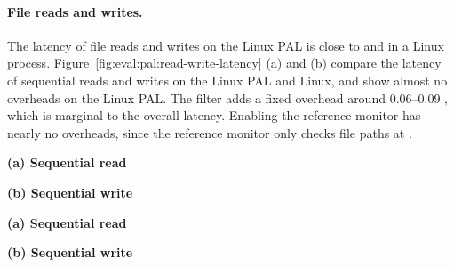 \paragraph{File reads and writes.}
The latency of file reads and writes on the Linux PAL
is close to
 and 
in a Linux process.
Figure~\ref{fig:eval:pal:read-write-latency} (a) and (b) compare the latency of sequential reads and writes 
on the Linux PAL and Linux,
and show almost no overheads on the Linux PAL.
The \seccomp{} filter adds a fixed overhead
around 0.06--0.09 \msec{},
which is marginal to the overall latency.
Enabling the reference monitor has nearly no overheads,
since the reference monitor only checks file paths at .
 


\begin{figure*}[t!]
\centering
\footnotesize
{}
\parbox{0.49\textwidth}{\centering\bf (a) Sequential read}
\parbox{0.49\textwidth}{\centering\bf (b) Sequential write}
\caption{Latency of sequential  and  on the Linux PAL,
versus  and  on Linux.
Lower is better.
Figure (a) and (b) respectively compares  and  on the Linux PAL,
with and without a \seccomp{} filter ({\bf +SC})
and reference monitor ({\bf +RM}), against  and  on Linux.}
\label{fig:eval:pal:read-write-latency}
\end{figure*}

\begin{figure*}[t!]
\centering
\footnotesize
{}
\parbox{0.49\textwidth}{\centering\bf (a) Sequential read}
\parbox{0.49\textwidth}{\centering\bf (b) Sequential write}
\caption{Latency of sequential  and  on the \sgx{} PAL,
versus the Linux PAL and Linux.
Lower is better.
Figure (a) and (b) respectively compares  and  on the \sgx{} PAL,
with and without integrity checks ({\bf +CHK})
and reference monitor ({\bf +RM}), against the Linux PAL and  and  on Linux. The current design does not support integrity checks for .}
\label{fig:eval:pal:sgx-read-write-latency}
\end{figure*}


